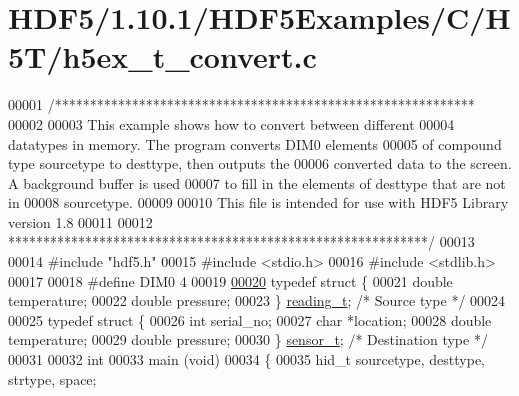 \hypertarget{_h_d_f5_21_810_81_2_h_d_f5_examples_2_c_2_h5_t_2h5ex__t__convert_8c_source}{}\section{H\+D\+F5/1.10.1/\+H\+D\+F5\+Examples/\+C/\+H5\+T/h5ex\+\_\+t\+\_\+convert.c}
\label{_h_d_f5_21_810_81_2_h_d_f5_examples_2_c_2_h5_t_2h5ex__t__convert_8c_source}

\begin{DoxyCode}
00001 \textcolor{comment}{/************************************************************}
00002 \textcolor{comment}{}
00003 \textcolor{comment}{  This example shows how to convert between different}
00004 \textcolor{comment}{  datatypes in memory.  The program converts DIM0 elements}
00005 \textcolor{comment}{  of compound type sourcetype to desttype, then outputs the}
00006 \textcolor{comment}{  converted data to the screen.  A background buffer is used}
00007 \textcolor{comment}{  to fill in the elements of desttype that are not in}
00008 \textcolor{comment}{  sourcetype.}
00009 \textcolor{comment}{}
00010 \textcolor{comment}{  This file is intended for use with HDF5 Library version 1.8}
00011 \textcolor{comment}{}
00012 \textcolor{comment}{ ************************************************************/}
00013 
00014 \textcolor{preprocessor}{#include "hdf5.h"}
00015 \textcolor{preprocessor}{#include <stdio.h>}
00016 \textcolor{preprocessor}{#include <stdlib.h>}
00017 
00018 \textcolor{preprocessor}{#define DIM0            4}
00019 
\hyperlink{structreading__t}{00020} \textcolor{keyword}{typedef} \textcolor{keyword}{struct }\{
00021     \textcolor{keywordtype}{double}  temperature;
00022     \textcolor{keywordtype}{double}  pressure;
00023 \} \hyperlink{structreading__t}{reading\_t};                                \textcolor{comment}{/* Source type */}
00024 
00025 \textcolor{keyword}{typedef} \textcolor{keyword}{struct }\{
00026     \textcolor{keywordtype}{int}     serial\_no;
00027     \textcolor{keywordtype}{char}    *location;
00028     \textcolor{keywordtype}{double}  temperature;
00029     \textcolor{keywordtype}{double}  pressure;
00030 \} \hyperlink{structsensor__t}{sensor\_t};                                 \textcolor{comment}{/* Destination type */}
00031 
00032 \textcolor{keywordtype}{int}
00033 main (\textcolor{keywordtype}{void})
00034 \{
00035     hid\_t       sourcetype, desttype, strtype, space;

\end{DoxyCode}
